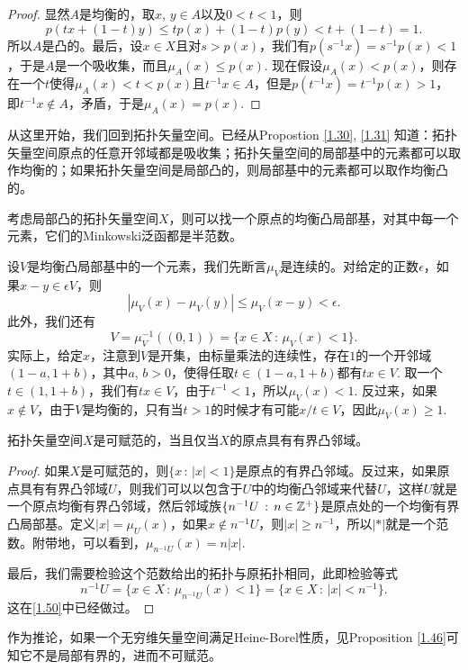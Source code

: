 \begin{proof}
显然$A$是均衡的，取$x$, $y\in A$以及$0<t<1$，则
\[
	p(tx+(1-t)y)\leq tp(x)+(1-t)p(y)< t+(1-t)=1.
\]
所以$A$是凸的。最后，设$x\in X$且对$s>p(x)$，我们有$p(s^{-1}x)=s^{-1}p(x)<1$，于是$A$是一个吸收集，而且$\mu_A(x)\leq p(x)$. 现在假设$\mu_A(x)<p(x)$，则存在一个$t$使得$\mu_A(x)<t<p(x)$且$t^{-1}x\in A$，但是$p(t^{-1}x)=t^{-1}p(x)>1$，即$t^{-1}x\not\in A$，矛盾，于是$\mu_A(x)=p(x)$.
\end{proof}

\begin{para}\label{1.50}
从这里开始，我们回到拓扑矢量空间。已经从Propostion \ref{1.30}, \ref{1.31} 知道：拓扑矢量空间原点的任意开邻域都是吸收集；拓扑矢量空间的局部基中的元素都可以取作均衡的；如果拓扑矢量空间是局部凸的，则局部基中的元素都可以取作均衡凸的。

考虑局部凸的拓扑矢量空间$X$，则可以找一个原点的均衡凸局部基，对其中每一个元素，它们的Minkowski泛函都是半范数。

设$V$是均衡凸局部基中的一个元素，我们先断言$\mu_V$是连续的。对给定的正数$\epsilon$，如果$x-y\in \epsilon V$，则
\[
	|\mu_V(x)-\mu_V(y)|\leq \mu_V(x-y)<\epsilon.
\]
此外，我们还有
\[
	V=\mu_V^{-1}((0,1))=\{x\in X\,:\, \mu_V(x)<1\}.
\]
实际上，给定$x$，注意到$V$是开集，由标量乘法的连续性，存在$1$的一个开邻域$(1-a,1+b)$，其中$a$, $b>0$，使得任取$t\in (1-a,1+b)$都有$tx\in V$. 取一个$t\in (1,1+b)$，我们有$tx\in V$，由于$t^{-1}<1$，所以$\mu_V(x)<1$. 反过来，如果$x\not\in V$，由于$V$是均衡的，只有当$t>1$的时候才有可能$x/t \in V$，因此$\mu_V(x)\geq 1$.
\end{para}

\begin{thm}
拓扑矢量空间$X$是可赋范的，当且仅当$X$的原点具有有界凸邻域。
\end{thm}

\begin{proof}
如果$X$是可赋范的，则$\{x\,:\, |x|<1\}$是原点的有界凸邻域。反过来，如果原点具有有界凸邻域$U$，则我们可以以包含于$U$中的均衡凸邻域来代替$U$，这样$U$就是一个原点均衡有界凸邻域，然后邻域族$\{n^{-1}U\,:\, n\in \mathbb{Z}^+\}$是原点处的一个均衡有界凸局部基。定义$|x|=\mu_U(x)$，如果$x\not\in n^{-1}U$，则$|x|\geq n^{-1}$，所以$|*|$就是一个范数。附带地，可以看到，$\mu_{n^{-1}U}(x)=n|x|$.

最后，我们需要检验这个范数给出的拓扑与原拓扑相同，此即检验等式
\[
	n^{-1}U=\{x\in X\,:\, \mu_{n^{-1}U}(x)<1\}=\{x\in X\,:\,|x|<n^{-1}\}.
\]
这在\ref{1.50}中已经做过。
\end{proof}

作为推论，如果一个无穷维矢量空间满足Heine-Borel性质，见Proposition \ref{1.46}可知它不是局部有界的，进而不可赋范。

